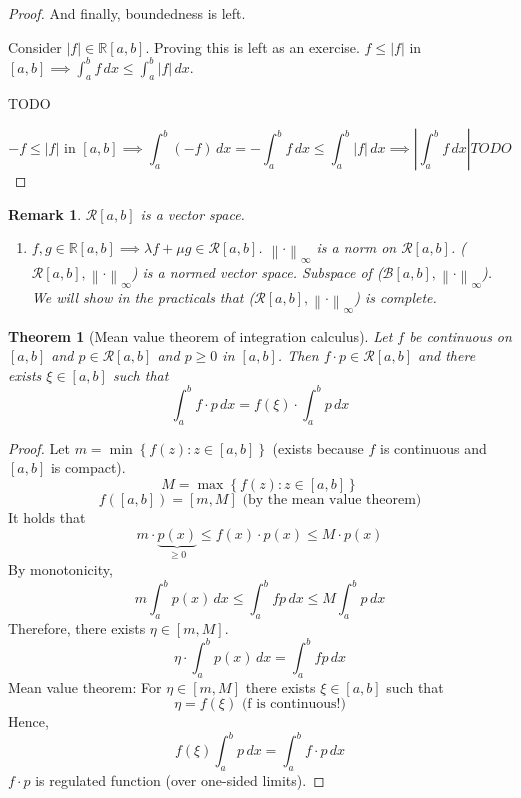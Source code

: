 \documentclass{article}
\newtheorem{theorem}{Theorem}  \numberwithin{theorem}{section}
\newtheorem{remark}{Remark}  \numberwithin{remark}{section}
\newcommand{\set}[1]{\left\{#1\right\}}
\newcommand{\norm}[1]{\left\|#1\right\|}
\newcommand{\card}[1]{\left|#1\right|}
\begin{document}
\begin{proof}
  And finally, boundedness is left.

  Consider $\card{f} \in \mathbb R[a,b]$. Proving this is left as an exercise.
  $f \leq \card{f}$ in $[a,b] \implies \int_a^b f \, dx \leq \int_a^b \card{f} \, dx$.

  TODO

  \[ -f \leq \card{f} \text{ in } [a,b] \implies \int_a^b (-f) \, dx = -\int_a^b f \, dx \leq \int_a^b \card{f} \, dx
    \implies \card{\int_a^b f \, dx} TODO
  \]
\end{proof}

\begin{remark}
  $\mathcal R[a,b]$ is a vector space.

  \begin{enumerate}
    \item $f, g \in \mathbb R[a,b] \implies \lambda f + \mu g \in \mathcal R[a,b]$.
      $\norm{\cdot}_{\infty}$ is a norm on $\mathcal R[a,b]$.
      ($\mathcal R[a,b], \norm{\cdot}_{\infty}$) is a normed vector space.
      Subspace of ($\mathcal B[a,b], \norm{\cdot}_{\infty}$).
      We will show in the practicals that ($\mathcal R[a,b], \norm{\cdot}_{\infty}$) is complete.
  \end{enumerate}
\end{remark}

\begin{theorem}[Mean value theorem of integration calculus]
  \label{mvt} \label{satz3}
  Let $f$ be continuous on $[a,b]$ and $p \in \mathcal R[a,b]$
  and $p \geq 0$ in $[a,b]$.
  Then $f \cdot p \in \mathcal R[a,b]$ and there exists $\xi \in [a,b]$ such that
  \[ \int_a^b f \cdot p \, dx = f(\xi) \cdot \int_a^b p \, dx \]
\end{theorem}
\begin{proof}
  Let $m = \min\set{f(z): z \in [a,b]}$ (exists because $f$ is continuous and $[a,b]$ is compact).
  \[ M = \max\set{f(z): z \in [a,b]} \]
  \[ f([a,b]) = [m, M] \text{ (by the mean value theorem)} \]
  It holds that
  \[ m \cdot \underbrace{p(x)}_{\geq 0} \leq f(x) \cdot p(x) \leq M \cdot p(x) \]
  By monotonicity,
  \[ m \int_a^b p(x) \, dx \leq \int_a^b fp \, dx \leq M \int_a^b p \, dx \]
  Therefore, there exists $\eta \in [m, M]$.
  \[ \eta \cdot \int_a^b p(x) \, dx = \int_a^b fp \, dx \]
  Mean value theorem: For $\eta \in [m,M]$ there exists $\xi \in [a,b]$ such that
  \[ \eta = f(\xi) \text{ (f is continuous!)} \]
  Hence,
  \[ f(\xi) \int_a^b p \, dx = \int_a^b f \cdot p \, dx \]
  $f \cdot p$ is regulated function (over one-sided limits).
\end{proof}
\end{document}

